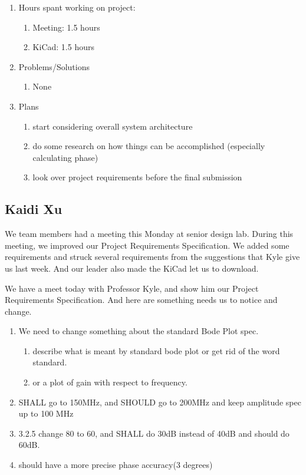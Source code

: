 \documentclass{article}
\begin{document}
\begin{enumerate}
\item{Hours spant working on project:
    \begin{enumerate}
    \item{Meeting: 1.5 hours}
    \item{KiCad: 1.5 hours}
    \end{enumerate}
}
\item{Problems/Solutions
\begin{enumerate}
\item{None}
\end{enumerate}
}
\item{Plans
\begin{enumerate}
\item{start considering overall system architecture}
\item{do some research on how things can be accomplished (especially calculating phase)}
\item{look over project requirements before the final submission}
\end{enumerate}
}
\end{enumerate}

\subsection*{Kaidi Xu}

We team members had a meeting this Monday at senior design lab. During this
meeting, we improved our Project Requirements Specification. We added some
requirements and struck several requirements from the suggestions that Kyle
give us last week. And our leader also made the KiCad let us to download.

We have a meet today with Professor Kyle, and show him our Project Requirements
Specification. And here are something needs us to notice and change. 

\begin{enumerate}
\item{We need to change something about the standard Bode Plot spec.
    \begin{enumerate}
    \item{describe what is meant by standard bode plot or get rid of the word standard.}
    \item{or a plot of gain with respect to frequency.}
    \end{enumerate}
}
\item{SHALL go to 150MHz, and SHOULD go to 200MHz and keep amplitude spec up to 100 MHz}
\item{3.2.5 change 80 to 60, and SHALL do 30dB instead of 40dB and should do 60dB.}
\item{should have a more precise phase accuracy(3 degrees)}
\end{enumerate}
\end{document}
